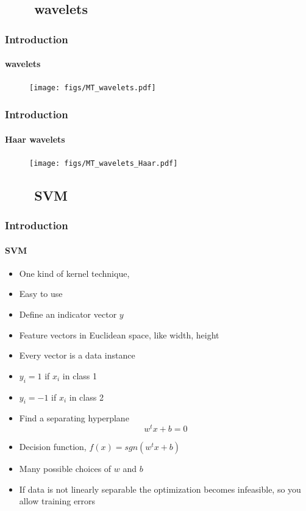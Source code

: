 \subsection{\ \ \ \ wavelets}
\begin{frame}
\frametitle{Introduction}
\framesubtitle{wavelets}
\logoCSIPCPL\mypagenum
	\begin{figure}				
		\texttt{[image: figs/MT\_wavelets.pdf]}
	\end{figure}
\end{frame}

\begin{frame}
\frametitle{Introduction}
\framesubtitle{Haar wavelets}
\logoCSIPCPL\mypagenum
	\begin{figure}				
		\texttt{[image: figs/MT\_wavelets\_Haar.pdf]}
	\end{figure}
\end{frame}


\subsection{\ \ \ \ SVM}
\begin{frame}
\frametitle{Introduction}
\framesubtitle{SVM}
\logoCSIPCPL\mypagenum
	\begin{itemize}
		\item One kind of kernel technique, 
		\item Easy to use
		\item Define an indicator vector $y$
		\item Feature vectors in Euclidean space, like width, height
		\item Every vector is a data instance 
		\item $y_i=1$ if $x_i$ in class 1
		\item $y_i=-1$ if $x_i$ in class 2
		\item Find a separating hyperplane
			\begin{equation*}
				w^tx + b=0
			\end{equation*}
		\item Decision function, $f(x)=sgn(w^tx + b)$
		\item Many possible choices of $w$ and $b$
		\item If data is not linearly separable the optimization becomes infeasible, so you allow training errors
	\end{itemize}
\end{frame}




